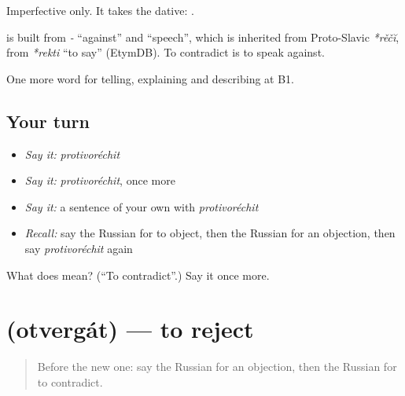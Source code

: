Imperfective only. It takes the dative: \emph{ }.

\begin{cousinweb}
\textbf{} is built from \emph{-} \textquotedblleft{}against\textquotedblright{} and \emph{} \textquotedblleft{}speech\textquotedblright{}, which is inherited from Proto-Slavic \emph{*rěčĭ}, from \emph{*rekti} \textquotedblleft{}to say\textquotedblright{} (EtymDB). To contradict is to speak against.
\end{cousinweb}

\begin{grammarlens}[title={What you've built}]
One more word for telling, explaining and describing at B1.
\end{grammarlens}

\subsection*{Your turn}
\begin{itemize}
\raggedright
  \item \emph{Say it:} \emph{protivoréchit}
  \item \emph{Say it:} \emph{protivoréchit}, once more
  \item \emph{Say it:} a sentence of your own with \emph{protivoréchit}
  \item \emph{Recall:} say the Russian for to object, then the Russian for an objection, then say \emph{protivoréchit} again
\end{itemize}

\begin{tcolorbox}[breakable,colback=teal!4,colframe=teal!35!black,title={Before you move on}]
What does  mean? (\textquotedblleft{}To contradict\textquotedblright{}.) Say it once more.
\end{tcolorbox}
\section[\texorpdfstring{\ru{отвергать} (otvergát)}{отвергать (otvergát)}]{ (otvergát) — to reject}

\label{lesson:RU-C341-otvergat}



\begin{quote}
Before the new one: say the Russian for an objection, then the Russian for to contradict.
\end{quote}

